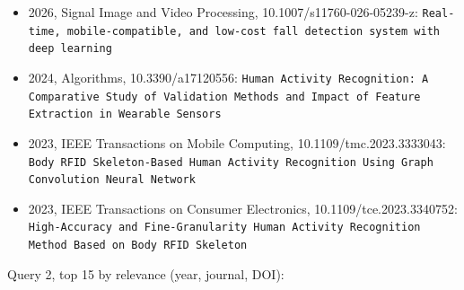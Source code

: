 \begin{itemize}
\item 2026, Signal Image and Video Processing, 10.1007/s11760-026-05239-z: \texttt{Real-time, mobile-compatible, and low-cost fall detection system with deep learning}
\item 2024, Algorithms, 10.3390/a17120556: \texttt{Human Activity Recognition: A Comparative Study of Validation Methods and Impact of Feature Extraction in Wearable Sensors}
\item 2023, IEEE Transactions on Mobile Computing, 10.1109/tmc.2023.3333043: \texttt{Body RFID Skeleton-Based Human Activity Recognition Using Graph Convolution Neural Network}
\item 2023, IEEE Transactions on Consumer Electronics, 10.1109/tce.2023.3340752: \texttt{High-Accuracy and Fine-Granularity Human Activity Recognition Method Based on Body RFID Skeleton}
\end{itemize}

Query 2, top 15 by relevance (year, journal, DOI):

